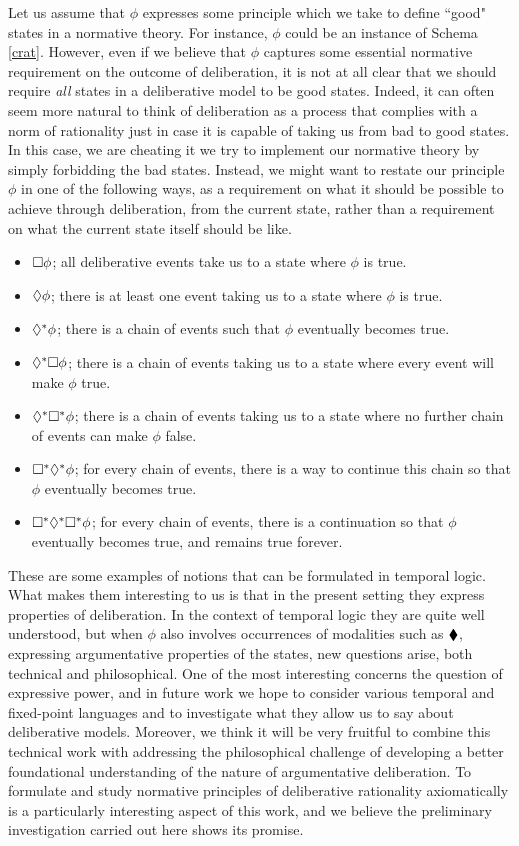 \documentclass[greybox]{svmult}
\begin{document}
Let us assume that $\phi$ expresses some principle which we take to define ``good" states in a normative theory. For instance, $\phi$ could be an instance of Schema \ref{crat}. However, even if we believe that $\phi$ captures some essential normative requirement on the outcome of deliberation, it is not at all clear that we should require \emph{all} states in a deliberative model to be good states. Indeed, it can often seem more natural to think of deliberation as a process that complies with a norm of rationality just in case it is capable of taking us from bad to good states. In this case, we are cheating it we try to implement our normative theory by simply forbidding the bad states. Instead, we might want to restate our principle $\phi$ in one of the following ways, as a requirement on what it should be possible to achieve through deliberation, from the current state, rather than a requirement on what the current state itself should be like.

\begin{itemize}
\item $\square \phi$; all deliberative events take us to a state where $\phi$ is true.
\item $\lozenge \phi$; there is at least one event taking us to a state where $\phi$ is true.
\item $\lozenge^\ast \phi$; there is a chain of events such that $\phi$ eventually becomes true.
\item $\lozenge^\ast \square \phi$; there is a chain of events taking us to a state where every event will make $\phi$ true.
\item $\lozenge^\ast \square^\ast \phi$; there is a chain of events taking us to a state where no further chain of events can make $\phi$ false.
\item $\square^\ast \lozenge^\ast \phi$; for every chain of events, there is a way to continue this chain so that $\phi$ eventually becomes true.
\item $\square^\ast \lozenge^\ast \square^\ast \phi$; for every chain of events, there is a continuation so that $\phi$ eventually becomes true, and remains true forever.
\end{itemize}

These are some examples of notions that can be formulated in temporal logic. What makes them interesting to us is that in the present setting they express properties of deliberation. In the context of temporal logic they are quite well understood, but when $\phi$ also involves occurrences of modalities such as $\blacklozenge$, expressing argumentative properties of the states, new questions arise, both technical and philosophical. One of the most interesting concerns the question of expressive power, and in future work we hope to consider various temporal and fixed-point languages and to investigate what they allow us to say about deliberative models. Moreover, we think it will be very fruitful to combine this technical work with addressing the philosophical challenge of developing a better foundational understanding of the nature of argumentative deliberation. To formulate and study normative principles of deliberative rationality axiomatically is a particularly interesting aspect of this work, and we believe the preliminary investigation carried out here shows its promise.
\end{document}

